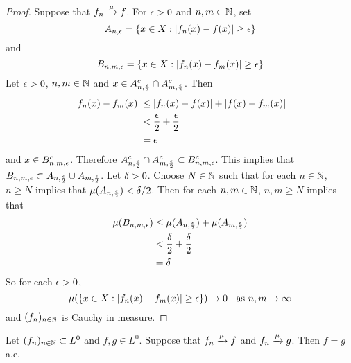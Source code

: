 \documentclass{book}
\begin{document}
	\begin{proof}
	Suppose that $f_n \xrightarrow{\mu} f$. For $\epsilon >0$ and $n,m \in \mathbb{N}$, set 
	$$A_{n, \epsilon} = \{x \in X: |f_n(x) - f(x)| \geq \epsilon \}$$ 
	and 
	$$B_{n,m, \epsilon} = \{x \in X: |f_n(x) - f_m(x)| \geq \epsilon \}$$
	Let $\epsilon >0$, $n, m \in \mathbb{N}$ and $x \in A_{n, \frac{\epsilon}{2}}^c \cap A_{m, \frac{\epsilon}{2}}^c$. Then 
	\begin{align*}
	|f_n(x) - f_m(x)| 
	& \leq  |f_n(x) - f(x)| + |f(x) - f_m(x)| \\
	& < \frac{\epsilon}{2} + \frac{\epsilon}{2} \\
	&= \epsilon  
	\end{align*}
	and $x \in B_{n,m, \epsilon}^c$. Therefore $A_{n, \frac{\epsilon}{2}}^c \cap A_{m, \frac{\epsilon}{2}}^c \subset B_{n,m, \epsilon}^c$. This implies that $B_{n,m, \epsilon} \subset A_{n, \frac{\epsilon}{2}} \cup A_{m, \frac{\epsilon}{2}}$. Let $\delta >0$. Choose $N \in \mathbb{N}$ such that for each $n \in \mathbb{N}$, $n \geq N$ implies that $\mu(A_{n, \frac{\epsilon}{2}}) < \delta/2$. Then for each $n,m \in \mathbb{N}$, $n, m \geq N$ implies that 
	\begin{align*}
	\mu(B_{n,m, \epsilon}) 
	&\leq \mu(A_{n, \frac{\epsilon}{2}}) + \mu(A_{m, \frac{\epsilon}{2}}) \\
	& < \frac{\delta}{2} + \frac{\delta}{2} \\
	&= \delta
	\end{align*}
	So for each $\epsilon >0$, $$\mu(\{x \in X: |f_n(x) - f_m(x)| \geq \epsilon \}) \rightarrow 0 \hspace{.2cm }\text{ as } n,m \rightarrow \infty$$  
	and $(f_n)_{n \in \mathbb{N}}$ is Cauchy in measure.
	\end{proof}
	
	\begin{ex}
	Let $(f_n)_{n \in \mathbb{N}} \subset L^0$ and $f, g \in L^0$. Suppose that $f_n \xrightarrow{\mu} f$ and $f_n \xrightarrow{\mu} g$. Then $f = g$ a.e. 
	\end{ex}
	
\end{document}
